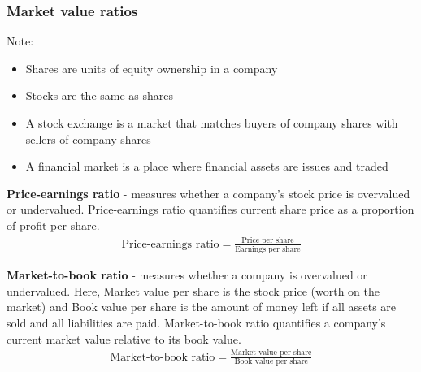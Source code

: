 \subsubsection{Market value ratios}
Note:
\begin{itemize}
    \item Shares are units of equity ownership in a company
    \item Stocks are the same as shares
    \item A stock exchange is a market that matches buyers of company shares with sellers of company shares
    \item A financial market is a place where financial assets are issues and traded
\end{itemize}
\textbf{Price-earnings ratio} - measures whether a company's stock price is overvalued or undervalued. Price-earnings ratio quantifies current share price as a proportion of profit per share.
\begin{gather}
    \textrm{Price-earnings ratio} = \frac{\textrm{Price per share}}{\textrm{Earnings per share}}
\end{gather}

\textbf{Market-to-book ratio} - measures whether a company is overvalued or undervalued. Here, Market value per share is the stock price (worth on the market) and Book value per share is the amount of money left if all assets are sold and all liabilities are paid. Market-to-book ratio quantifies a company's current market value relative to its book value.
\begin{gather}
    \textrm{Market-to-book ratio} = \frac{\textrm{Market value per share}}{\textrm{Book value per share}}
\end{gather}